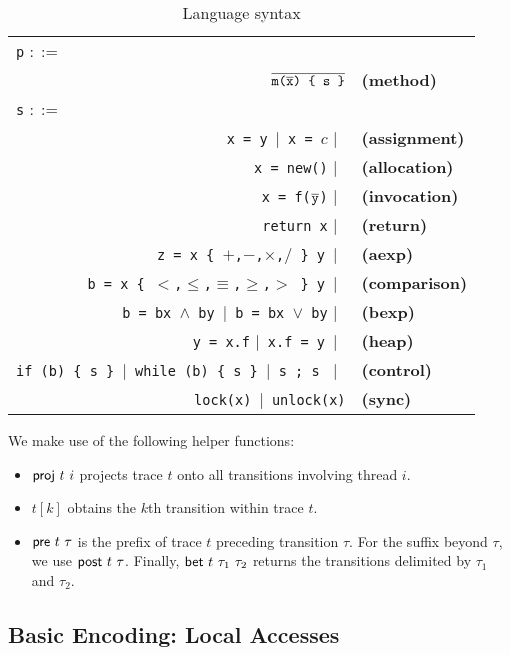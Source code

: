 \begin{table}
	\begin{center}
	\begin{tabular}{rl}
						\multicolumn{1}{l}{{\tt p} $::=$} & \\
					    $\overline{\texttt{m($\overline{{\tt x}}$) \{ s \}}}$ & {\bf (method)} \\
						\multicolumn{1}{l}{{\tt s} $::=$} & \\
						{\tt x = y}\ $|$\ {\tt x = $c$} $|$\ & {\bf (assignment)} \\
						{\tt x = new()} $|$\ & {\bf (allocation)} \\
						{\tt x = f($\overline{{\tt y}}$)} $|$\ & {\bf (invocation)} \\
						{\tt return x} $|$\ & {\bf (return)} \\
						{\tt z = x \{ $+$,$-$,$\times$,$/$ \} y}\ $|$\ & {\bf (aexp)} \\
						{\tt b = x \{ $<$,$\leq$,$\equiv$,$\geq$,$>$ \} y}\ $|$\ & {\bf (comparison)} \\
						{\tt b = bx $\wedge$ by}\ $|$\ {\tt b = bx $\vee$ by} $|$\ & {\bf (bexp)} \\
						{\tt y = x.f} $|$\ {\tt x.f = y}\ $|$\ & {\bf (heap)} \\
						{\tt if (b) \{ s \} $|$\ {\tt while (b) \{  s \}} $|$\ {\tt s ; s }} $|$\ & {\bf (control)} \\
						{\tt lock(x)}\ $|$\ {\tt unlock(x)} & {\bf (sync)}
	\end{tabular}
	\end{center}
	\caption{\label{Ta:syntax}Language syntax}
\end{table}

We make use of the following helper functions:
\begin{itemize}
	\item ${\sf proj}\ t\ i$ projects trace $t$ onto all transitions involving thread $i$.
	\item $t[k]$ obtains the $k$th transition within trace $t$.
	\item ${\sf pre}\ t\ \tau$ is the prefix of trace $t$ preceding transition $\tau$. For the suffix beyond $\tau$, we 
	use ${\sf post}\ t\ \tau$. Finally, ${\sf bet}\ t\ \tau_1\ \tau_2$ returns the transitions delimited by $\tau_1$ and $\tau_2$.
\end{itemize}

\subsection{Basic Encoding: Local Accesses}

